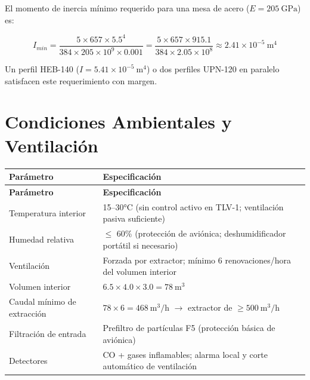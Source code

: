 \documentclass[11pt, a4paper]{article}
\begin{document}
El momento de inercia mínimo requerido para una mesa de acero ($E = 205\ \text{GPa}$) es:

\begin{equation}
  I_{min} = \frac{5 \times 657 \times 5.5^4}{384 \times 205 \times 10^9 \times 0.001}
  = \frac{5 \times 657 \times 915.1}{384 \times 2.05 \times 10^8}
  \approx 2.41 \times 10^{-5}\ \text{m}^4
\end{equation}

Un perfil HEB-140 ($I = 5.41 \times 10^{-5}\ \text{m}^4$) o dos perfiles UPN-120 en paralelo satisfacen este requerimiento con margen.

\section{Condiciones Ambientales y Ventilación}

\begin{longtable}{L{4.5cm} L{9cm}}
  \color{white}\textbf{Parámetro} &
  \color{white}\textbf{Especificación} \\
  \endfirsthead
  \color{white}\textbf{Parámetro} &
  \color{white}\textbf{Especificación} \\
  \endhead
  Temperatura interior      & 15--30°C (sin control activo en TLV-1; ventilación pasiva suficiente) \\
  Humedad relativa          & $\leq$ 60\% (protección de aviónica; deshumidificador portátil si necesario) \\
  Ventilación               & Forzada por extractor; mínimo 6 renovaciones/hora del volumen interior \\
  Volumen interior          & $6.5 \times 4.0 \times 3.0 = 78\ \text{m}^3$ \\
  Caudal mínimo de extracción & $78 \times 6 = 468\ \text{m}^3/\text{h}$ $\rightarrow$ extractor de $\geq 500\ \text{m}^3/\text{h}$ \\
  Filtración de entrada     & Prefiltro de partículas F5 (protección básica de aviónica) \\
  Detectores                & CO + gases inflamables; alarma local y corte automático de ventilación \\
\end{longtable}

\end{document}
